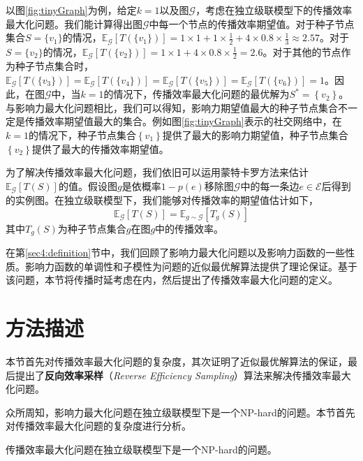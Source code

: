 以图\ref{fig:tinyGraph}为例，给定$k=1$以及图$\mathcal{G}$，考虑在独立级联模型下的传播效率最大化问题。我们能计算得出图$\mathcal{G}$中每一个节点的传播效率期望值。对于种子节点集合$S=\{v_1\}$的情况，$\mathbb{E}_\mathcal{G}\left[T\left(\{v_1\}\right)\right] = 1\times1 + 1\times\frac{1}{2} + 4\times0.8\times\frac{1}{3}\approx2.57$。对于$S=\{v_2\}$的情况，$\mathbb{E}_\mathcal{G}\left[T\left(\{v_2\}\right)\right] = 1\times1 + 4\times0.8\times\frac{1}{2} = 2.6$。对于其他的节点作为种子节点集合时，$\mathbb{E}_\mathcal{G}\left[T\left(\{v_3\}\right)\right] = \mathbb{E}_\mathcal{G}\left[T\left(\{v_4\}\right)\right] = \mathbb{E}_\mathcal{G}\left[T\left(\{v_5\}\right)\right] = \mathbb{E}_\mathcal{G}\left[T\left(\{v_6\}\right)\right] = 1$。因此，在图$\mathcal{G}$中，当$k=1$的情况下，传播效率最大化问题的最优解为$S^\ast = \left\{v_2\right\}$。与影响力最大化问题相比，我们可以得知，影响力期望值最大的种子节点集合不一定是传播效率期望值最大的集合。例如图\ref{fig:tinyGraph}表示的社交网络中，在$k=1$的情况下，种子节点集合$\left\{v_1\right\}$提供了最大的影响力期望值，种子节点集合$\left\{v_2\right\}$提供了最大的传播效率期望值。

为了解决传播效率最大化问题，我们依旧可以运用蒙特卡罗方法来估计$\mathbb{E}_\mathcal{G}\left[T\left(S\right)\right]$的值。假设图$g$是依概率$1-p\left(e\right)$移除图$\mathcal{G}$中的每一条边$e\in\mathcal{E}$后得到的实例图。在独立级联模型下，我们能够对传播效率的期望值估计如下，
\begin{equation}\label{eq:expectedIE}
    \mathbb{E}_\mathcal{G}\left[T\left(S\right)\right] = \mathbb{E}_{g\sim\mathcal{G}}\left[T_g\left(S\right)\right]
\end{equation}
其中$T_g\left(S\right)$为种子节点集合$g$在图$g$中的传播效率。

在第\ref{sec4:definition}节中，我们回顾了影响力最大化问题以及影响力函数的一些性质。影响力函数的单调性和子模性为问题的近似最优解算法提供了理论保证。基于该问题，本节将传播时延考虑在内，然后提出了传播效率最大化问题的定义。
\section{方法描述}
\label{sec4:method}
本节首先对传播效率最大化问题的复杂度，其次证明了近似最优解算法的保证，最后提出了\textbf{反向效率采样}（\textit{Reverse Efficiency Sampling}）算法来解决传播效率最大化问题。

众所周知，影响力最大化问题在独立级联模型下是一个NP-hard的问题。本节首先对传播效率最大化问题的复杂度进行分析。

\begin{mytheo}\label{theo:npHard}
传播效率最大化问题在独立级联模型下是一个NP-hard的问题。
\end{mytheo}

